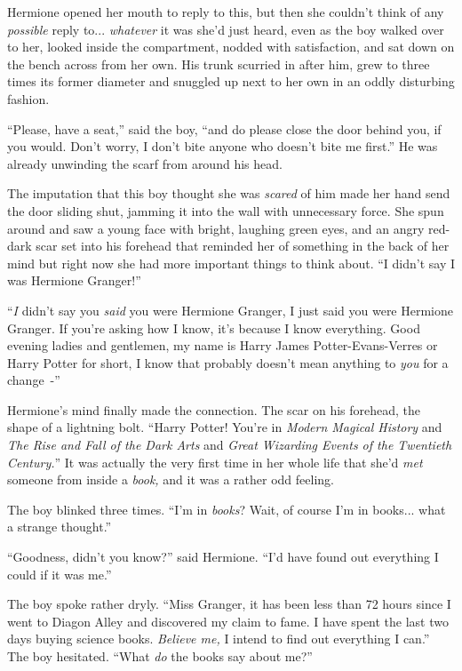 Hermione opened her mouth to reply to this, but then she couldn't think of any \emph{possible} reply to... \emph{whatever} it was she'd just heard, even as the boy walked over to her, looked inside the compartment, nodded with satisfaction, and sat down on the bench across from her own. His trunk scurried in after him, grew to three times its former diameter and snuggled up next to her own in an oddly disturbing fashion.

``Please, have a seat,'' said the boy, ``and do please close the door behind you, if you would. Don't worry, I don't bite anyone who doesn't bite me first.'' He was already unwinding the scarf from around his head.

The imputation that this boy thought she was \emph{scared} of him made her hand send the door sliding shut, jamming it into the wall with unnecessary force. She spun around and saw a young face with bright, laughing green eyes, and an angry red-dark scar set into his forehead that reminded her of something in the back of her mind but right now she had more important things to think about. ``I didn't say I was Hermione Granger!''

``\emph{I} didn't say you \emph{said} you were Hermione Granger, I just said you were Hermione Granger. If you're asking how I know, it's because I know everything. Good evening ladies and gentlemen, my name is Harry James Potter-Evans-Verres or Harry Potter for short, I know that probably doesn't mean anything to \emph{you} for a change~-''

Hermione's mind finally made the connection. The scar on his forehead, the shape of a lightning bolt. ``Harry Potter! You're in \emph{Modern Magical History} and \emph{The Rise and Fall of the Dark Arts} and \emph{Great Wizarding Events of the Twentieth Century.}'' It was actually the very first time in her whole life that she'd \emph{met} someone from inside a \emph{book,} and it was a rather odd feeling.

The boy blinked three times. ``I'm in \emph{books}? Wait, of course I'm in books... what a strange thought.''

``Goodness, didn't you know?'' said Hermione. ``I'd have found out everything I could if it was me.''

The boy spoke rather dryly. ``Miss Granger, it has been less than 72 hours since I went to Diagon Alley and discovered my claim to fame. I have spent the last two days buying science books. \emph{Believe me,} I intend to find out everything I can.'' The boy hesitated. ``What \emph{do} the books say about me?''

